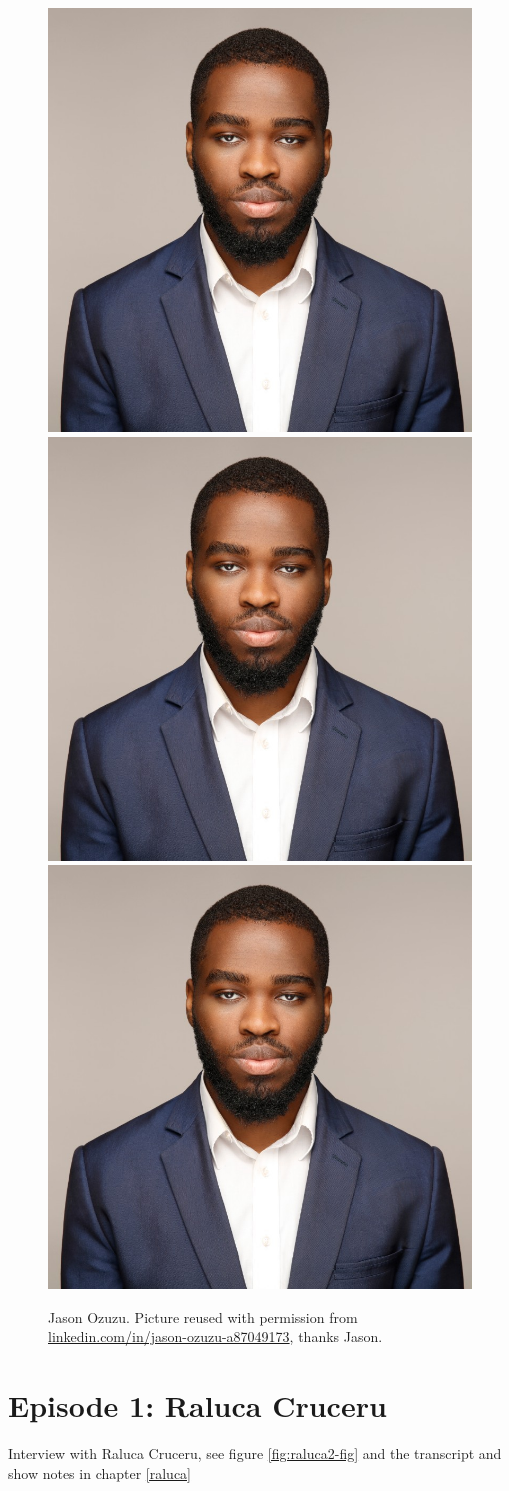 \documentclass[
]{book}
\begin{document}
\begin{figure}
\includegraphics[width=0.33\linewidth]{images/jason} \includegraphics[width=0.33\linewidth]{images/jason} \includegraphics[width=0.33\linewidth]{images/jason} \caption{Jason Ozuzu. Picture reused with permission from \href{https://www.linkedin.com/in/jason-ozuzu-a87049173/}{linkedin.com/in/jason-ozuzu-a87049173}, thanks Jason.}\label{fig:jason2-fig}
\end{figure}

\hypertarget{ep1}{%
\section{Episode 1: Raluca Cruceru}\label{ep1}}

Interview with Raluca Cruceru, see figure \ref{fig:raluca2-fig} and the transcript and show notes in chapter \ref{raluca}
\end{document}
